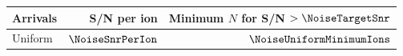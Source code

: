 \begin{tabular}{lrr}
\toprule
Arrivals & S/N per ion & Minimum $N$ for S/N $>\NoiseTargetSnr$ \\
\midrule
Uniform & $\NoiseSnrPerIon$ & $\NoiseUniformMinimumIons$ \\
\bottomrule
\end{tabular}
